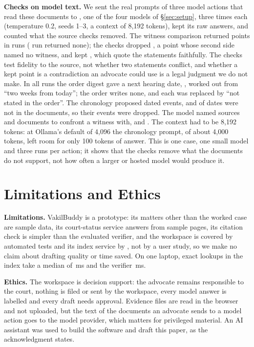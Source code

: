 \textbf{Checks on model text.} We sent the real prompts of three model actions that read these documents to \GroundModel, one of the four models of \S\ref{sec:setup}, three times each (temperature 0.2, seeds 1--3, a context of 8{,}192 tokens), kept its raw answers, and counted what the source checks removed. The witness comparison returned \GroundMatrixProposed{} points in \GroundMatrixRuns{} runs (\GroundMatrixEmptyRuns{} run returned none); the checks dropped \GroundMatrixDropped, a point whose second side named no witness, and kept \GroundMatrixKept, which quote the statements faithfully. The checks test fidelity to the source, not whether two statements conflict, and whether a kept point is a contradiction an advocate could use is a legal judgment we do not make. In all \GroundDigestRuns{} runs the order digest gave a next hearing date, \GroundDigestDates, worked out from ``two weeks from today''; the order writes none, and each was replaced by ``not stated in the order''. The chronology proposed \GroundTimelineProposed{} dated events, and \GroundIsoMissing{} of \GroundIsoProposed{} dates were not in the documents, so their events were dropped. The model named \GroundSourcesNamed{} sources and \GroundQDocsNamed{} documents to confront a witness with, and \GroundSuppliedClause. The context had to be 8{,}192 tokens: at Ollama's default of 4{,}096 the chronology prompt, of about 4{,}000 tokens, left room for only 100 tokens of answer. This is one case, one small model and three runs per action; it shows that the checks remove what the documents do not support, not how often a larger or hosted model would produce it.

\section{Limitations and Ethics}
\label{sec:discussion}
\textbf{Limitations.} VakilBuddy is a prototype: its matters other than the worked case are sample data, its court-status service answers from sample pages, its citation check is simpler than the evaluated verifier, and the workspace is covered by \CaseTestsWorkspace{} automated tests and its index service by \CaseTestsApi{}, not by a user study, so we make no claim about drafting quality or time saved. On one laptop, exact lookups in the index take a median of \LatExactMedian\,ms and the verifier \VerifyMedianMs\,ms.

\textbf{Ethics.} The workspace is decision support: the advocate remains responsible to the court, nothing is filed or sent by the workspace, every model answer is labelled and every draft needs approval. Evidence files are read in the browser and not uploaded, but the text of the documents an advocate sends to a model action goes to the model provider, which matters for privileged material. An AI assistant was used to build the software and draft this paper, as the acknowledgment states.

